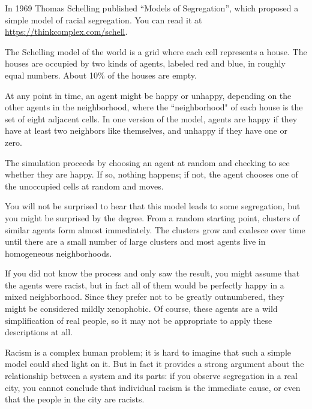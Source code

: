 \documentclass[12pt]{book}
\theoremstyle{exercise}
\begin{document}
In 1969 Thomas Schelling published ``Models of Segregation'',
which proposed a simple model of racial segregation.  You can read it
at \url{https://thinkcomplex.com/schell}.

The Schelling model of the world is a grid where each cell represents a house.  The houses are occupied by two kinds of agents,
labeled red and blue, in roughly equal numbers.  About 10\% of the
houses are empty.


At any point in time, an agent might be happy or unhappy, depending
on the other agents in the neighborhood, where the
``neighborhood" of each house is the set of eight adjacent cells.
In one version of the model, agents are happy if they have at least
two neighbors like themselves, and unhappy if they have one or zero.


The simulation proceeds by choosing an agent at random and checking
to see whether they are happy.  If so, nothing happens; if not,
the agent chooses one of the unoccupied cells at random and moves.

You will not be surprised to hear that this model leads to some
segregation, but you might be surprised by the degree.  From a random starting point, clusters of similar agents form almost immediately.  The clusters
grow and coalesce over time until there are a small number
of large clusters and most agents live in homogeneous
neighborhoods.


If you did not know the process and only saw the result, you might
assume that the agents were racist, but in fact all of them
would be perfectly happy in a mixed neighborhood.  Since they prefer
not to be greatly outnumbered, they might be considered mildly xenophobic.  Of course, these agents are a wild simplification of real people, so it may not be appropriate to apply these descriptions at all.


Racism is a complex human problem; it is hard to imagine that such a
simple model could shed light on it.  But in fact it provides a strong
argument about the relationship between a system and its parts: if you
observe segregation in a real city, you cannot conclude that
individual racism is the immediate cause, or even that the people in
the city are racists.
\end{document}
